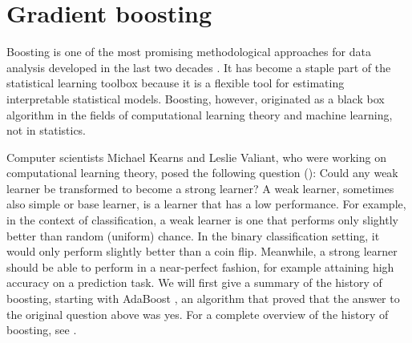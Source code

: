 \chapter{Gradient boosting}\label{ch:boosting}
Boosting is one of the most promising methodological approaches for data analysis developed in the last two decades \citep{mayr14a}.
It has become a staple part of the statistical learning toolbox because it is a flexible tool for estimating interpretable statistical models.
Boosting, however, originated as a black box algorithm in the fields of computational learning theory and machine learning, not in statistics.

Computer scientists Michael Kearns and Leslie Valiant, who were working on computational learning theory, posed the following question (\citep{kearnsvaliant}): 
Could any weak learner be transformed to become a strong learner?
A weak learner, sometimes also simple or base learner, is a learner that has a low performance.
For example, in the context of classification, a weak learner is one that performs only slightly better than random (uniform) chance.
In the binary classification setting, it would only perform slightly better than a coin flip.
Meanwhile, a strong learner should be able to perform in a near-perfect fashion, for example attaining high accuracy on a prediction task.
We will first give a summary of the history of boosting, starting with AdaBoost \citep{adaboost}, an algorithm that proved that the answer to the original question above was yes.
For a complete overview of the history of boosting, see \citet{mayr14a, mayr14b, mayr17}.

